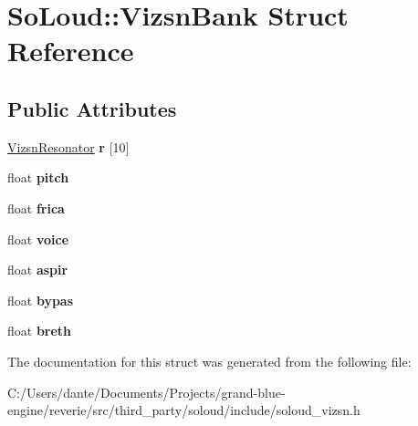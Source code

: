 \hypertarget{struct_so_loud_1_1_vizsn_bank}{}\section{So\+Loud\+::Vizsn\+Bank Struct Reference}
\label{struct_so_loud_1_1_vizsn_bank}
\subsection*{Public Attributes}
\begin{DoxyCompactItemize}
\item 
\mbox{\label{struct_so_loud_1_1_vizsn_bank_a65924bfb437131d92ac8054ced71ced8}} 
\mbox{\hyperlink{struct_so_loud_1_1_vizsn_resonator}{Vizsn\+Resonator}} {\bfseries r} \mbox{[}10\mbox{]}
\item 
\mbox{\label{struct_so_loud_1_1_vizsn_bank_a5f7dfb9bc44795ab8d2ebb226c1e0938}} 
float {\bfseries pitch}
\item 
\mbox{\label{struct_so_loud_1_1_vizsn_bank_acd2682a3835f6a993c6533f84687779f}} 
float {\bfseries frica}
\item 
\mbox{\label{struct_so_loud_1_1_vizsn_bank_ad2e4dc58903f15aa4056bcf934015724}} 
float {\bfseries voice}
\item 
\mbox{\label{struct_so_loud_1_1_vizsn_bank_a3e8a20b0ea17ec45011b07f280c67e00}} 
float {\bfseries aspir}
\item 
\mbox{\label{struct_so_loud_1_1_vizsn_bank_a3c4ac54b9bcee1624f915319db5af1f6}} 
float {\bfseries bypas}
\item 
\mbox{\label{struct_so_loud_1_1_vizsn_bank_aaa118d5ff111906eb8de96bdd30816f5}} 
float {\bfseries breth}
\end{DoxyCompactItemize}


The documentation for this struct was generated from the following file\+:\begin{DoxyCompactItemize}
\item 
C\+:/\+Users/dante/\+Documents/\+Projects/grand-\/blue-\/engine/reverie/src/third\+\_\+party/soloud/include/soloud\+\_\+vizsn.\+h\end{DoxyCompactItemize}

